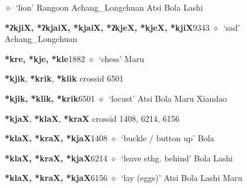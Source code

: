 \begin{list}{}{\leftmargin=1.5em \itemindent=-1.5em}
         $\diamond$~`lion'
         Rangoon 
\hspace{1ex}
         Achang\_Longchuan 
\hspace{1ex}
         Atsi 
\hspace{1ex}
         Bola 
\hspace{1ex}
         Lashi 
  \item {\footnotesize \textbf{*ʔkjiX, *ʔkjaiX, *kjaiX, *ʔkjeX, *kjeX, *kjiX}}{\tiny 9343}
\hspace{1ex}
         $\diamond$~`sad'
         Achang\_Longchuan 
  \item {\footnotesize \textbf{*kre, *kje, *kle}}{\tiny 1882}
\hspace{1ex}
         $\diamond$~`chess'
         Maru 
  \end{list}
\item
\textbf{*kjik}, \textbf{*krik}, \textbf{*klik}
  {\tiny crossid 6501}
  \begin{list}{}{\leftmargin=1.5em \itemindent=-1.5em}
  \item {\footnotesize \textbf{*kjik, *klik, *krik}}{\tiny 6501}
         $\diamond$~`locust'
         Atsi 
\hspace{1ex}
         Bola 
\hspace{1ex}
         Maru 
\hspace{1ex}
         Xiandao 
  \end{list}
\item
\textbf{*kjaX}, \textbf{*klaX}, \textbf{*kraX}
  {\tiny crossid 1408, 6214, 6156}
  \begin{list}{}{\leftmargin=1.5em \itemindent=-1.5em}
  \item {\footnotesize \textbf{*klaX, *kraX, *kjaX}}{\tiny 1408}
         $\diamond$~`buckle / button up'
         Bola 
  \item {\footnotesize \textbf{*klaX, *kraX, *kjaX}}{\tiny 6214}
\hspace{1ex}
         $\diamond$~`leave sthg. behind'
         Bola 
\hspace{1ex}
         Lashi 
  \item {\footnotesize \textbf{*klaX, *kraX, *kjaX}}{\tiny 6156}
\hspace{1ex}
         $\diamond$~`lay (eggs)'
         Atsi 
\hspace{1ex}
         Bola 
\hspace{1ex}
         Lashi 
\hspace{1ex}
         Maru 
  \end{list}
